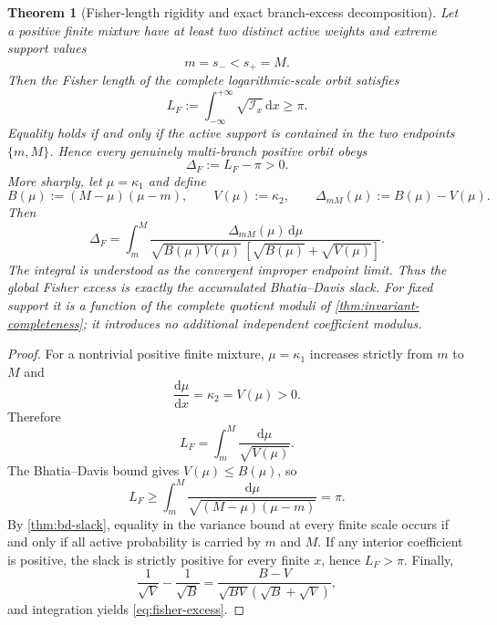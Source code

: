 \documentclass[aps,prd,preprint,onecolumn,nofootinbib,superscriptaddress,showkeys]{revtex4-2}
\numberwithin{equation}{section}
\theoremstyle{definition}
\theoremstyle{plain}
\newtheorem{theorem}{Theorem}[section]
\newcommand{\dd}{\mathrm d}
\begin{document}
\begin{theorem}[Fisher-length rigidity and exact branch-excess decomposition]\label{thm:fisher-rigidity}
Let a positive finite mixture have at least two distinct active weights and extreme support values
\[
m=s_-<s_+=M.
\]
Then the Fisher length of the complete logarithmic-scale orbit satisfies
\begin{equation}
\boxed{
L_F:=\int_{-\infty}^{+\infty}\sqrt{\mathcal I_x}\,\dd x\ge\pi.
}
\end{equation}
Equality holds if and only if the active support is contained in the two endpoints $\{m,M\}$.  Hence every genuinely multi-branch positive orbit obeys
\begin{equation}
\boxed{\Delta_F:=L_F-\pi>0.}
\end{equation}
More sharply, let $\mu=\kappa_1$ and define
\[
B(\mu):=(M-\mu)(\mu-m),
\qquad
V(\mu):=\kappa_2,
\qquad
\Delta_{mM}(\mu):=B(\mu)-V(\mu).
\]
Then
\begin{equation}
\boxed{
\Delta_F
=
\int_m^M
\frac{\Delta_{mM}(\mu)\,\dd\mu}
{\sqrt{B(\mu)V(\mu)}\,[\sqrt{B(\mu)}+\sqrt{V(\mu)}]}.
}
\label{eq:fisher-excess}
\end{equation}
The integral is understood as the convergent improper endpoint limit.  Thus the global Fisher excess is exactly the accumulated Bhatia--Davis slack.  For fixed support it is a function of the complete quotient moduli of \cref{thm:invariant-completeness}; it introduces no additional independent coefficient modulus.
\end{theorem}

\begin{proof}
For a nontrivial positive finite mixture, $\mu=\kappa_1$ increases strictly from $m$ to $M$ and
\[
\frac{\dd\mu}{\dd x}=\kappa_2=V(\mu)>0.
\]
Therefore
\[
L_F=\int_m^M\frac{\dd\mu}{\sqrt{V(\mu)}}.
\]
The Bhatia--Davis bound gives $V(\mu)\le B(\mu)$, so
\[
L_F\ge\int_m^M\frac{\dd\mu}{\sqrt{(M-\mu)(\mu-m)}}=\pi.
\]
By \cref{thm:bd-slack}, equality in the variance bound at every finite scale occurs if and only if all active probability is carried by $m$ and $M$.  If any interior coefficient is positive, the slack is strictly positive for every finite $x$, hence $L_F>\pi$.  Finally,
\[
\frac1{\sqrt V}-\frac1{\sqrt B}
=\frac{B-V}{\sqrt{BV}(\sqrt B+\sqrt V)},
\]
and integration yields \cref{eq:fisher-excess}.
\end{proof}
\end{document}
